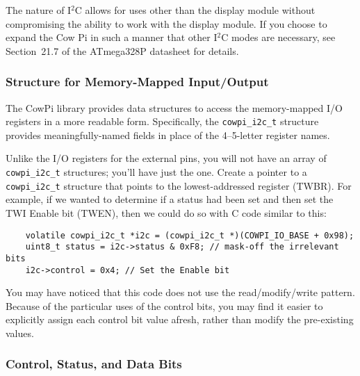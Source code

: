 The nature of I$^2$C allows for uses other than the display module without compromising the ability to work with the display module.
If you choose to expand the Cow Pi in such a manner that other I$^2$C modes are necessary, see Section~21.7 of the ATmega328P datasheet\cite{ATmega328P} for details.

\subsubsection{Structure for Memory-Mapped Input/Output} \label{subsubsec:TWIstruct}

The CowPi library provides data structures to access the memory-mapped I/O registers in a more readable form.
Specifically, the \lstinline{cowpi_i2c_t} structure provides meaningfully-named fields in place of the 4--5-letter register names.



Unlike the I/O registers for the external pins, you will not have an array of \lstinline{cowpi_i2c_t} structures;
you'll have just the one.
Create a pointer to a \lstinline{cowpi_i2c_t} structure that points to the lowest-addressed register (TWBR).
For example, if we wanted to determine if a status had been set and then set the TWI Enable bit (TWEN), then we could do so with C code similar to this:

\begin{lstlisting}
    volatile cowpi_i2c_t *i2c = (cowpi_i2c_t *)(COWPI_IO_BASE + 0x98);
    uint8_t status = i2c->status & 0xF8; // mask-off the irrelevant bits
    i2c->control = 0x4; // Set the Enable bit
\end{lstlisting}


You may have noticed that this code does not use the read/modify/write pattern.
Because of the particular uses of the control bits, you may find it easier to explicitly assign each control bit value afresh, rather than modify the pre-existing values.

\subsubsection{Control, Status, and Data Bits} \label{subsubsec:TWIbits}

